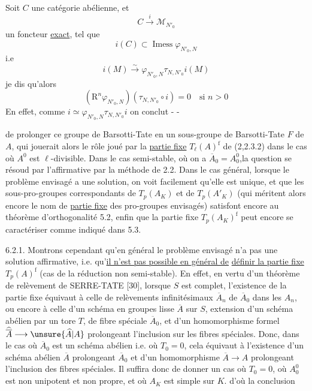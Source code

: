Soit \(C\) une catégorie abélienne, et
\[C\overset{i}\longrightarrow\mathcal M_{N'_0}\]
un foncteur \uline{exact}, tel que
\[i(C)\subset\operatorname{Imess}\varphi_{N'_0,N}\]
i.e
\[
i(M)\overset\sim\longrightarrow\varphi_{N'_0,N}\tau_{N,N'_0}i(M)
\]
je dis qu'alors
\[
(\mathrm R^n\varphi_{N'_0,N})(\tau_{N,N'_0}\circ i)=0
 \quad\text{si }n>0
\]
En effet, comme \(i\simeq\varphi_{N'_0,N}\tau_{N,N'_0}i\)
on conclut
-  - 

de prolonger ce groupe de Barsotti-Tate en un sous-groupe de Barsotti-Tate
\(F\) de \(A\), qui jouerait alors le rôle joué par la \uline{partie fixe}
\(T_\ell(A)^{\mathrm f}\) de (2,2.3.2) dans le cas où \(A^0\) est
\(\ell\)-divisible. Dans le cas semi-stable, où on a \(\overline A_0=A_0^0\),la
question se résoud par l'affirmative par la méthode de 2.2. Dans le cas général,
lorsque le problème envisagé a une solution, on voit facilement qu'elle est
unique, et que les sous-pro-groupes correspondants de \(T_p(A_K)\) et de
\(T_p(A'_K)\) (qui méritent alors encore le nom de \uline{partie fixe} des
pro-groupes envisagés) satisfont encore au théorème d'orthogonalité 5.2, enfin que
la partie fixe \(T_p(A_K)^{\mathrm f}\) peut encore se caractériser comme indiqué
dans 5.3.

6.2.1. Montrons cependant qu'en général le problème envisagé n'a pas une
solution affirmative, i.e. qu'\uline{il n'est pas possible en général de}
\uline{définir la partie fixe} \(T_p(A)^{\mathrm f}\) (cas de la réduction non
semi-stable). En effet, en vertu d'un théorème de relèvement de SERRE-TATE [30],
lorsque \(S\) est complet, l'existence de la partie fixe équivaut à celle de
relèvements infinitésimaux \(\overline A_n\) de \(\overline A_0\) dans les
\(A_n\), ou encore à celle d'un schéma en groupes lisse \(\overline A\) sur
\(S\), extension d'un schéma abélien par un tore \(T\), de fibre spéciale
\(\overline A_0\), et d'un homomorphisme formel
\(\widehat{\overline A}\longrightarrow\unsure{\widehat A|A}\) prolongeant
l'inclusion sur les fibres spéciales. Donc, dans le cas où \(\overline A_0\)
est un schéma abélien i.e. où \(T_0=0\), cela équivaut à l'existence d'un schéma
abélien \(\overline A\) prolongeant \(\overline A_0\) et d'un homomorphisme
\(\overline A\longrightarrow A\) prolongeant l'inclusion des fibres spéciales.
Il suffira donc de donner un cas où \(T_0=0\), où \(A_0^0\) est non unipotent
et non propre, et où \(A_K\) est simple sur \(K\).
d'où la conclusion


